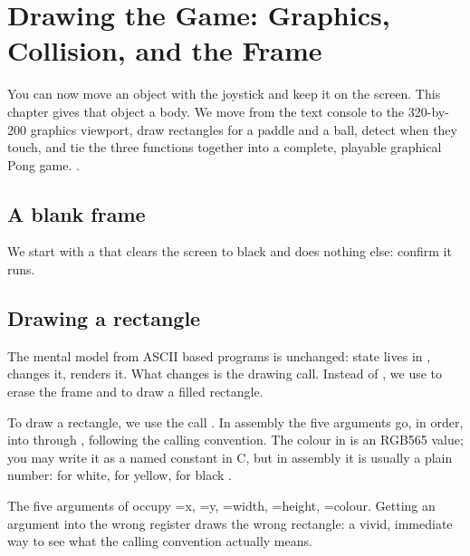 \chapter{Drawing the Game: Graphics, Collision, and the Frame}
\label{ch:asm3}

You can now move an object with the joystick and keep it on the screen. This
chapter gives that object a body. We move from the text console to the
320-by-200 graphics viewport, draw rectangles for a paddle and a ball, detect
when they touch, and tie the three functions together into a complete, playable
graphical Pong game. \citep{prg32qemu,prg32tutorialgraphic}.

\section{A blank frame}

We start with a  that clears the screen to black and does nothing else: confirm it runs.



\section{Drawing a rectangle}

The mental model from ASCII based programs is unchanged: state lives in ,
 changes it,  renders it. What changes is the drawing
call. Instead of , we use  to
erase the frame and  to draw a filled rectangle.

To draw a rectangle, we use the call . 
In assembly the five arguments go, in order, into  through , 
following the calling convention. The colour in  is an RGB565 value; 
you may write it as a named constant in C,
but in assembly it is usually a plain number:  for white,
 for yellow,  for black \citep{prg32repo}.

\begin{prgwarn}
The five arguments of  occupy =x, =y,
=width, =height, =colour. Getting an argument into the
wrong register draws the wrong rectangle: a vivid, immediate way to see what the
calling convention actually means.
\end{prgwarn}

